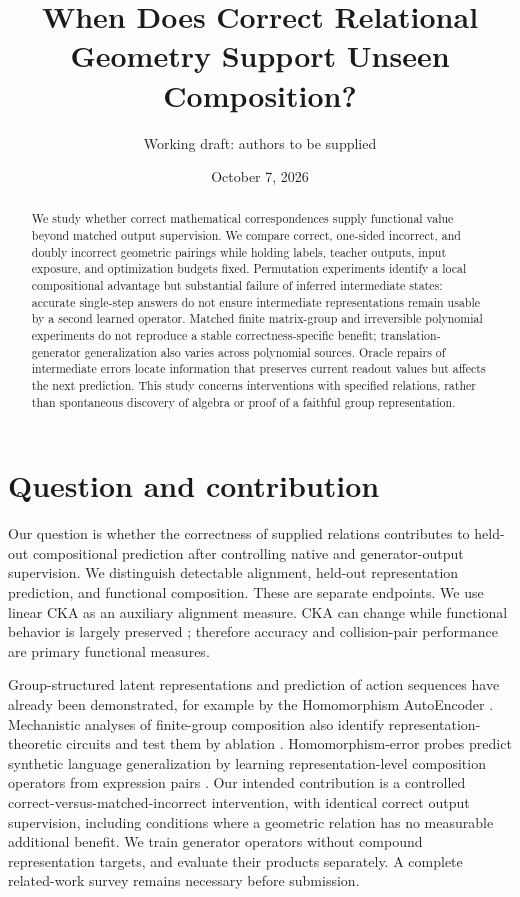 \documentclass[11pt]{article}
\title{When Does Correct Relational Geometry Support Unseen Composition?}
\author{Working draft: authors to be supplied}
\date{October 7, 2026}
\begin{document}
\maketitle
\begin{abstract}
We study whether correct mathematical correspondences supply functional value beyond matched output supervision. We compare correct, one-sided incorrect, and doubly incorrect geometric pairings while holding labels, teacher outputs, input exposure, and optimization budgets fixed. Permutation experiments identify a local compositional advantage but substantial failure of inferred intermediate states: accurate single-step answers do not ensure intermediate representations remain usable by a second learned operator. Matched finite matrix-group and irreversible polynomial experiments do not reproduce a stable correctness-specific benefit; translation-generator generalization also varies across polynomial sources. Oracle repairs of intermediate errors locate information that preserves current readout values but affects the next prediction. This study concerns interventions with specified relations, rather than spontaneous discovery of algebra or proof of a faithful group representation.
\end{abstract}

\section{Question and contribution}
Our question is whether the correctness of supplied relations contributes to held-out compositional prediction after controlling native and generator-output supervision. We distinguish detectable alignment, held-out representation prediction, and functional composition. These are separate endpoints. We use linear CKA \cite{kornblith2019} as an auxiliary alignment measure. CKA can change while functional behavior is largely preserved \cite{davari2022}; therefore accuracy and collision-pair performance are primary functional measures.

Group-structured latent representations and prediction of action sequences have already been demonstrated, for example by the Homomorphism AutoEncoder \cite{keurti2023}. Mechanistic analyses of finite-group composition also identify representation-theoretic circuits and test them by ablation \cite{chughtai2023}. Homomorphism-error probes predict synthetic language generalization by learning representation-level composition operators from expression pairs \cite{an2026}. Our intended contribution is a controlled correct-versus-matched-incorrect intervention, with identical correct output supervision, including conditions where a geometric relation has no measurable additional benefit. We train generator operators without compound representation targets, and evaluate their products separately. A complete related-work survey remains necessary before submission.
\end{document}
